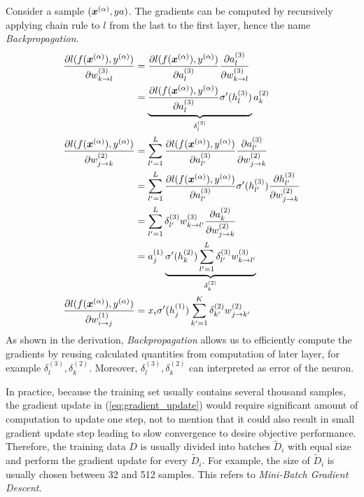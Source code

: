 Consider a sample $(\xa, ya)$. The gradients can be computed by recursively applying chain rule to $l$ from the last to the first layer, hence the name \textit{Backpropagation}.
\begin{align}
	\frac{\partial l(f(\xa), \ya)  }{\partial w_{k \rightarrow l}^{(3)} } &= 	\frac{\partial l(f(\xa), \ya) }{\partial a_{l}^{(3)} }  \frac{\partial a_{l}^{(3)} }{\partial w_{k \rightarrow l}^{(3)} }  	\\
		&= 	\underbrace{\frac{\partial l(f(\xa), \ya) }{\partial a_{l}^{(3)} } \sigma'(h_l^{(3)})}_{ \delta_l^{(3)}} a_{k}^{(2)} 	\\
	\frac{\partial l(f(\xa), \ya)  }{\partial w_{j \rightarrow k}^{(2)} } 
		&=  \sum_{l' = 1}^{L} 	\frac{\partial l(f(\xa), \ya) }{\partial a_{l'}^{(3)} } \frac{\partial a_{l'}^{(3)}}{\partial w_{j \rightarrow k}^{(2)}} \\
		&= \sum_{l' = 1}^{L} 	\frac{\partial l(f(\xa), \ya) }{\partial a_{l'}^{(3)} } \sigma'(h_{l'}^{(3)})  \frac{\partial h_{l'}^{(3)} }{\partial w_{j \rightarrow k}^{(2)}} \\
		&= \sum_{l' = 1}^{L} 	\delta_{l'}^{(3)}  w_{k \rightarrow l'}^{(3)} \frac{\partial a_{k}^{(2)} }{\partial w_{j \rightarrow k}^{(2)}} \\
		&= a_{j}^{(1)}  \underbrace{\sigma'(h_{k}^{(2)}) \sum_{l' = 1}^{L} 	\delta_{l'}^{(3)} w_{k \rightarrow l'}^{(3)}}_{\delta_{k}^{(2)}}  \\
	\frac{\partial l(f(\xa), \ya)  }{\partial w_{i \rightarrow j}^{(1)} } &=  x_i  \sigma'(h_{j}^{(1)}) \sum_{k' = 1}^{K} 	\delta_{k'}^{(2)} w_{j \rightarrow k'}^{(2)} 
\end{align}
As shown in the derivation, \textit{Backpropagation} allows us to efficiently compute the gradients by reusing calculated quantities from computation of later layer, for example $\delta_l^{(3)}, 	\delta_{k}^{(2)}$. Moreover, $\delta_l^{(3)}, 	\delta_{k}^{(2)}$ can interpreted as error of the neuron. 

In practice, because the training set usually contains several thousand samples, the gradient update in  (\ref{eq:gradient_update}) would require significant amount of computation to update one step, not to mention that it could also result in small gradient update step leading to slow convergence to desire objective performance. Therefore, the training data $D$ is usually divided into batches  $\widetilde{D}_i$  with equal size and perform the gradient update for every $\widetilde{D}_i$. For example, the size of $\widetilde{D}_i$ is usually chosen between 32 and 512 samples. This refers to \textit{Mini-Batch Gradient Descent}.

